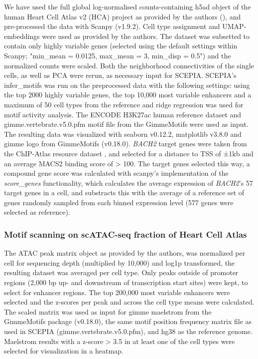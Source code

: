 We have used the full global log-normalised counts-containing h5ad object of the human Heart Cell Atlas v2 (HCA) project as provided by the authors (\cite{Kanemaru2023}), and pre-processed the data with Scanpy (v1.9.2). Cell type assignment and UMAP-embeddings were used as provided by the authors. The dataset was subsetted to contain only highly variable genes (selected using the default settings within Scanpy; "min\_mean = 0.0125, max\_mean = 3, min\_disp = 0.5") and the normalized counts were scaled. Both the neighborhood connectivities of the single cells, as well as PCA were rerun, as necessary input for SCEPIA. SCEPIA's infer\_motifs was run on the preprocessed data with the following settings: using the top 2000 highly variable genes, the top 10,000 most variable enhancers and a maximum of 50 cell types from the reference and ridge regression was used for motif activity analysis. The ENCODE H3K27ac human reference dataset and gimme.vertebrate.v5.0.pfm motif file from the GimmeMotifs were used as input. The resulting data was visualized with seaborn v0.12.2, matplotlib v3.8.0 and gimme logo from GimmeMotifs (v0.18.0). \textit{BACH2} target genes were taken from the ChIP-Atlas resource dataset \cite{Oki2018,Zou2022,BACH2 target genes}, and selected for a distance to TSS of ±1kb and an average MACS2 binding score of > 100. The target genes selected this way, a compound gene score was calculated with scanpy's implementation of the \textit{score\_genes} functionality, which calculates the average expression of \textit{BACH2}'s 57 target genes in a cell, and substracts this with the average of a reference set of genes randomly sampled from each binned expression level (577 genes were selected as reference).

\subsubsection{Motif scanning on scATAC-seq fraction of Heart Cell Atlas}

The ATAC peak matrix object as provided by the authors, was normalized per cell for sequencing depth (multiplied by 10,000) and log1p transformed, the resulting dataset was averaged per cell type. Only peaks outside of promoter regions (2,000 bp up- and downstream of transcription start sites) were kept, to select for enhancer regions. The top 200,000 most variable enhancers were selected and the z-scores per peak and across the cell type means were calculated. The scaled matrix was used as input for gimme maelstrom from the GimmeMotifs package (v0.18.0), the same motif position frequency matrix file as used in SCEPIA (gimme.vertebrate.v5.0.pfm), and hg38 as the reference genome. Maelstrom results with a z-score > 3.5 in at least one of the cell types were selected for visualization in a heatmap.


